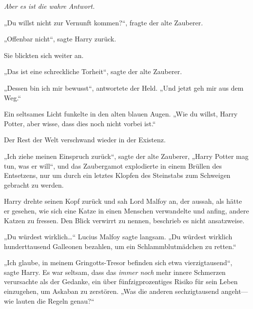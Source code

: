 \emph{Aber es ist die wahre Antwort.}

„Du willst nicht zur Vernunft kommen?“, fragte der alte Zauberer.

„Offenbar nicht“, sagte Harry zurück.

Sie blickten sich weiter an.

„Das ist eine schreckliche Torheit“, sagte der alte Zauberer.

„Dessen bin ich mir bewusst“, antwortete der Held. „Und jetzt geh mir aus dem Weg.“

Ein seltsames Licht funkelte in den alten blauen Augen.
„Wie du willst, Harry Potter, aber wisse, dass dies noch nicht vorbei ist.“

Der Rest der Welt verschwand wieder in der Existenz.

„Ich ziehe meinen Einspruch zurück“, sagte der alte Zauberer, „Harry Potter mag tun, was er will“, und das Zaubergamot explodierte in einem Brüllen des Entsetzens, nur um durch ein letztes Klopfen des Steinstabs zum Schweigen gebracht zu werden.

Harry drehte seinen Kopf zurück und sah Lord Malfoy an, der aussah, als hätte er gesehen, wie sich eine Katze in einen Menschen verwandelte und anfing, andere Katzen zu fressen. Den Blick verwirrt zu nennen, beschrieb es nicht ansatzweise.

„Du würdest wirklich…“ Lucius Malfoy sagte langsam. „Du würdest wirklich hunderttausend Galleonen bezahlen, um ein Schlammblutmädchen zu retten.“

„Ich glaube, in meinem Gringotts-Tresor befinden sich etwa vierzigtausend“, sagte Harry. Es war seltsam, dass das \emph{immer noch} mehr innere Schmerzen verursachte als der Gedanke, ein über fünfzigprozentiges Risiko für sein Leben einzugehen, um Askaban zu zerstören. „Was die anderen sechzigtausend angeht—wie lauten die Regeln genau?“

